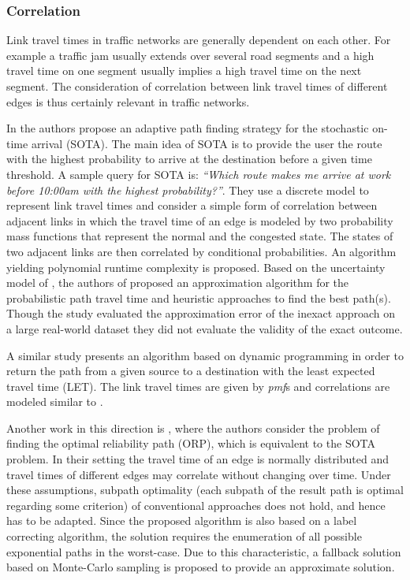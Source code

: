 \subsubsection{Correlation}
Link travel times in traffic networks are generally dependent on each
other. For example a traffic jam usually extends over several road segments
and a high travel time on one segment usually implies a high travel time on the
next segment. The consideration of correlation between link travel times of
different edges is thus certainly relevant in traffic networks.

In \cite{Nie06} the authors propose an adaptive path finding strategy for the
stochastic on-time arrival (SOTA). The main idea of SOTA is to provide
the user the route with the highest probability to arrive at the
destination before a given time threshold. A sample query for SOTA is:
\textit{``Which route makes me arrive at work before 10:00am with the highest
probability?''}. They use a discrete model to represent link travel times and consider a simple form of
correlation between adjacent links in which the travel time of an edge is
modeled by two probability mass functions that represent the normal and the
congested state. The states of two adjacent links are then correlated by
conditional probabilities. An algorithm yielding polynomial runtime complexity
is proposed.
Based on the uncertainty model of \cite{Nie06}, the authors of
\cite{Hua10} proposed an approximation algorithm for the probabilistic path
travel time and heuristic approaches to find the best path(s). Though the study
evaluated the approximation error of the inexact approach on a large
real-world dataset they did not evaluate the validity of the exact outcome.

 A similar study \cite{Fan05} presents an
algorithm based on dynamic programming in order to return the path from a given source to a destination
with the least expected travel time (LET). The link travel times are given by
\textit{pmf}s and correlations are modeled similar to \cite{Nie06}.

Another work in this direction is \cite{Seshadri10}, where the authors consider
the problem of finding the optimal reliability path (ORP), which is equivalent
to the SOTA problem. In their setting the travel time of an edge is normally
distributed and travel times of different edges may correlate without changing
over time. Under these assumptions, subpath optimality (each subpath of the
result path is optimal regarding some criterion) of conventional approaches
does not hold, and hence has to be adapted. Since the proposed algorithm is
also based on a label correcting algorithm, the solution requires the
enumeration of all possible exponential paths in the worst-case. Due to this
characteristic, a fallback solution based on Monte-Carlo sampling is proposed to provide an
approximate solution.

